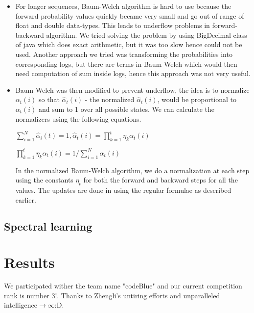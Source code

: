 \documentclass[letterpaper]{article}
\begin{document}
\begin{itemize}
\item For longer sequences, Baum-Welch algorithm is hard to use because the forward probability values quickly became very small and go out of range of float and double data-types. This leads to underflow problems in forward-backward algorithm. We tried solving the problem by using BigDecimal class of java which does exact arithmetic, but it was too slow hence could not be used. Another approach we tried was transforming the probabilities into corresponding logs, but there are terms in Baum-Welch which would then need computation of sum inside logs, hence this approach was not very useful.   

\item Baum-Welch was then modified  to prevent underflow, the idea is to normalize $\alpha_t(i)$ so that $\hat{\alpha}_{t}(i)$ - the normalized $\hat{\alpha}_{t}(i)$, would be proportional to $\alpha_{t}(i)$ and sum to 1 over all possible states. We can calculate the normalizers using the following equations. 

\begin{center}

$\sum_{i=1}^{N}\hat{\alpha}_{i}(t) = 1 , \hat{\alpha}_{t}(i) = \prod_{k=1}^t\eta_{k}\alpha_{t}(i)$ 

$\prod_{k=1}^t\eta_{k}\alpha_{t}(i) = 1/\sum_{i=1}^N\alpha_{t}(i)$

\end{center}

In the normalized Baum-Welch algorithm, we do a normalization at each step using the constants $\eta_{t}$ for both the forward and backward steps for all the values. The updates are done in using the regular formulae as described earlier.
 
\end{itemize}

\subsection{Spectral learning}



\section{Results}

We participated wither the team name "codeBlue" and our current competition rank is number 3!. Thanks to Zhengli's untiring efforts and unparalleled intelligence$\longrightarrow\infty$:D. 
\end{document}
